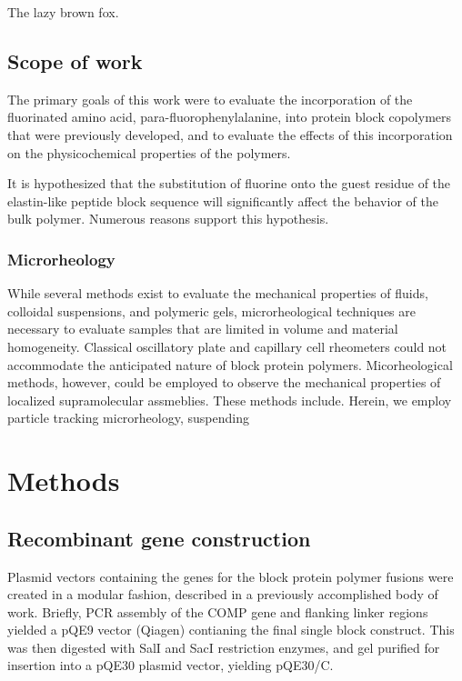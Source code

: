\begin{refsection}
The lazy brown fox.

\subsection{Scope of work}

The primary goals of this work were to evaluate the incorporation of
the fluorinated amino acid, para-fluorophenylalanine, into protein block
copolymers that were previously developed, and to evaluate the effects of this
incorporation on the physicochemical properties of the polymers.

It is hypothesized that the substitution of fluorine onto the guest residue of
the elastin-like peptide block sequence will significantly affect the behavior
of the bulk polymer. Numerous reasons support this hypothesis.


\subsubsection{Microrheology}

While several methods exist to evaluate the mechanical properties of fluids,
colloidal suspensions, and polymeric gels, microrheological techniques are
necessary to evaluate samples that are limited in volume and material
homogeneity. Classical oscillatory plate and capillary cell rheometers could not
accommodate the anticipated nature of block protein polymers. Micorheological
methods, however, could be employed to observe the mechanical properties of
localized supramolecular assmeblies. These methods include. Herein, we employ particle tracking microrheology, suspending

\section{Methods}

\subsection{Recombinant gene construction}

Plasmid vectors containing the genes for the block protein polymer fusions were
created in a modular fashion, described in a previously accomplished body of
work.\cite{Haghpanah2009} Briefly, PCR assembly of the COMP gene and
flanking linker regions yielded a pQE9 vector (Qiagen) contianing the final
single block construct. This was then digested with SalI and SacI restriction
enzymes, and gel purified for insertion into a pQE30 plasmid vector, yielding
pQE30/C. 


\end{refsection}
